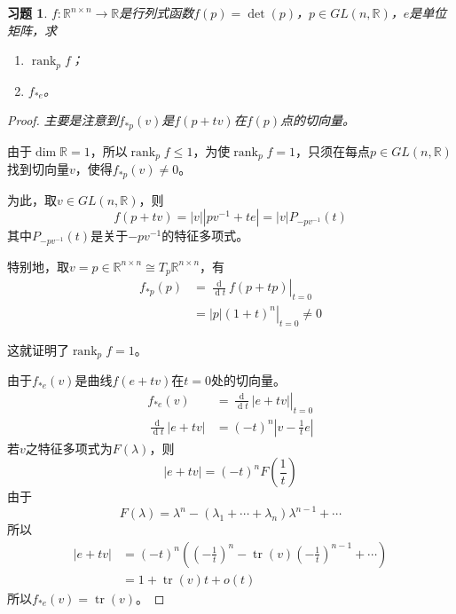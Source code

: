 \documentclass[winfonts,UTF8,c5size,a4paper,fancyhdr,hyperref,titlepage,nocap]{ctexart}
\newtheorem{xiti}{习题}
\theoremstyle{definition}
\theoremstyle{remark}
\numberwithin{equation}{subsection}
\newcommand{\Real}{\mathbb{R}}
\newcommand{\dt}{\frac{\operatorname{d}}{\operatorname{d}t}}
\newcommand{\rank}{\operatorname{rank}}
\newcommand{\tr}{\operatorname{tr}}
\newcommand{\local}[2]{\left.{#1}\right|_{#2}}%
\newcommand{\localt}[1]{\local{#1}{t=0}}%
\begin{document}
\begin{xiti}
  $f\colon\Real^{n\times n}\to\Real$是行列式函数$f(p)=\det(p)$，$p\in GL(n,\Real)$，$e$是单位矩阵，求
\begin{enumerate}[1)]
    \setlength{\itemindent}{2ex}
    \item $\rank_pf$；
    \item $f_{\ast e}$。
\end{enumerate}
\end{xiti}
\begin{proof}
  \emph{主要是注意到$f_{\ast p}(v)$是$f(p+tv)$在$f(p)$点的切向量。}

  由于$\dim\Real=1$，所以$\rank_pf\leqslant1$，为使$\rank_pf=1$，只须在每点$p\in GL(n,\Real)$找到切向量$v$，使得$f_{\ast p}(v)\neq0$。

  为此，取$v\in GL(n,\Real)$，则
  \begin{equation*}
  f(p+tv)=|v||pv^{-1}+te|=|v|P_{-pv^{-1}}(t)
  \end{equation*}
  其中$P_{-pv^{-1}}(t)$是关于$-pv^{-1}$的特征多项式。

  特别地，取$v=p\in\Real^{n\times n}\cong T_p\Real^{n\times n}$，有
  \begin{align*}
  f_{\ast p}(p)&=\localt{\dt f(p+tp)}\\
             &=|p|\localt{(1+t)^n}\neq0
  \end{align*}

这就证明了$\rank_pf=1$。

由于$f_{\ast e}(v)$是曲线$f(e+tv)$在$t=0$处的切向量。
\begin{align*}
f_{\ast e}(v)&=\localt{\dt|e+tv|}\\
\dt|e+tv|&=(-t)^n|v-\frac{1}{t}e|
\end{align*}
若$v$之特征多项式为$F(\lambda)$，则
\begin{equation*}
|e+tv|=(-t)^nF(\frac{1}{t})
\end{equation*}
由于
\begin{equation*}
F(\lambda)=\lambda^n-(\lambda_1+\cdots+\lambda_n)\lambda^{n-1}+\cdots
\end{equation*}
所以
\begin{align*}
|e+tv|&=(-t)^{n}((-\frac{1}{t})^n-\tr(v)(-\frac{1}{t})^{n-1}+\cdots)\\
      &=1+\tr(v) t+o(t)
\end{align*}
所以$f_{\ast e}(v)=\tr(v)$。
\end{proof}
\end{document}
